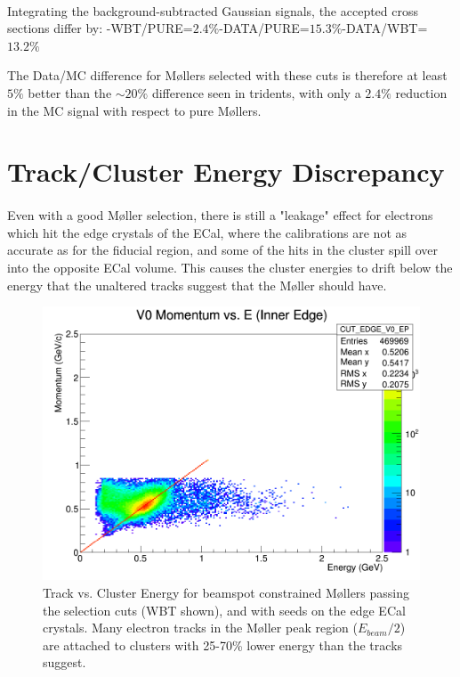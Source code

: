 \documentclass{article}
\begin{document}
\paragraph{}
Integrating the background-subtracted Gaussian signals, the accepted cross sections differ by:\newline
{}-WBT/PURE=$2.4\%$-DATA/PURE=$15.3\%$-DATA/WBT=$13.2\%$\newline

The Data/MC difference for M\o llers selected with these cuts is therefore at least $5\%$ better than the $\sim 20\%$ difference seen in tridents, with only a $2.4\%$ reduction in the MC signal with respect to pure M\o llers.

\section{Track/Cluster Energy Discrepancy}
\paragraph{}
Even with a good M\o ller selection, there is still a "leakage" effect for electrons which hit the edge crystals of the ECal, where the calibrations are not as accurate as for the fiducial region, and some of the hits in the cluster spill over into the opposite ECal volume. This causes the cluster energies to drift below the energy that the unaltered tracks suggest that the M\o ller should have.

\begin{figure}[H]
  	\includegraphics[width=\linewidth]{MollerPlots/EDGE_EP_bsc}
  	\caption{Track vs. Cluster Energy for beamspot constrained M\o llers passing the selection cuts (WBT shown), and with seeds on the edge ECal crystals. Many electron tracks in the M\o ller peak region ($E_{beam}/2$) are attached to clusters with 25-70\% lower energy than the tracks suggest.}
  	\label{fig:EPEdge}
	\end{figure}
\end{document}
